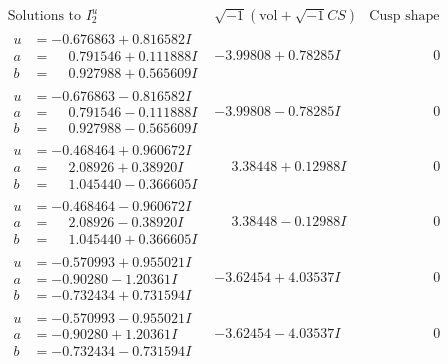 \documentclass[1p]{elsarticle_modified}
\theoremstyle{definition}
\newcommand{\I}{\sqrt{-1}}
\begin{document}
$$\begin{array}{c|c|c}  
\text{Solutions to }I^u_{2}& \I (\text{vol} + \sqrt{-1}CS) & \text{Cusp shape}\\
 \hline 
\begin{aligned}
u &= -0.676863 + 0.816582 I \\
a &= \phantom{-}0.791546 + 0.111888 I \\
b &= \phantom{-}0.927988 + 0.565609 I\end{aligned}
 & -3.99808 + 0.78285 I & \phantom{-0.000000 } 0 \\ \hline\begin{aligned}
u &= -0.676863 - 0.816582 I \\
a &= \phantom{-}0.791546 - 0.111888 I \\
b &= \phantom{-}0.927988 - 0.565609 I\end{aligned}
 & -3.99808 - 0.78285 I & \phantom{-0.000000 } 0 \\ \hline\begin{aligned}
u &= -0.468464 + 0.960672 I \\
a &= \phantom{-}2.08926 + 0.38920 I \\
b &= \phantom{-}1.045440 - 0.366605 I\end{aligned}
 & \phantom{-}3.38448 + 0.12988 I & \phantom{-0.000000 } 0 \\ \hline\begin{aligned}
u &= -0.468464 - 0.960672 I \\
a &= \phantom{-}2.08926 - 0.38920 I \\
b &= \phantom{-}1.045440 + 0.366605 I\end{aligned}
 & \phantom{-}3.38448 - 0.12988 I & \phantom{-0.000000 } 0 \\ \hline\begin{aligned}
u &= -0.570993 + 0.955021 I \\
a &= -0.90280 - 1.20361 I \\
b &= -0.732434 + 0.731594 I\end{aligned}
 & -3.62454 + 4.03537 I & \phantom{-0.000000 } 0 \\ \hline\begin{aligned}
u &= -0.570993 - 0.955021 I \\
a &= -0.90280 + 1.20361 I \\
b &= -0.732434 - 0.731594 I\end{aligned}
 & -3.62454 - 4.03537 I & \phantom{-0.000000 } 0 \\ \hline\begin{aligned}

\end{aligned}
\end{array}$$
\end{document}
